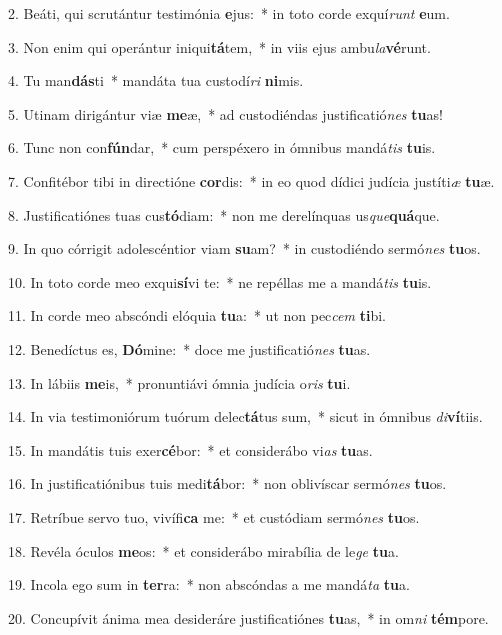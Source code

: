 2. Beáti, qui scrutántur testimónia \textbf{e}jus:~*  in toto corde exquí\textit{runt} \textbf{e}um.\

3. Non enim qui operántur iniqui\textbf{tá}tem,~*  in viis ejus ambu\textit{la}\textbf{vé}runt.\

4. Tu man\textbf{dás}ti~*  mandáta tua custodí\textit{ri} \textbf{ni}mis.\

5. Utinam dirigántur viæ \textbf{me}æ,~*  ad custodiéndas justificatió\textit{nes} \textbf{tu}as!\

6. Tunc non con\textbf{fún}dar,~*  cum perspéxero in ómnibus mandá\textit{tis} \textbf{tu}is.\

7. Confitébor tibi in directióne \textbf{cor}dis:~*  in eo quod dídici judícia justíti\textit{æ} \textbf{tu}æ.\

8. Justificatiónes tuas cus\textbf{tó}diam:~*  non me derelínquas us\textit{que}\textbf{quá}que.\

9. In quo córrigit adolescéntior viam \textbf{su}am?~*  in custodiéndo sermó\textit{nes} \textbf{tu}os.\

10. In toto corde meo exqui\textbf{sí}vi te:~*  ne repéllas me a mandá\textit{tis} \textbf{tu}is.\

11. In corde meo abscóndi elóquia \textbf{tu}a:~*  ut non pec\textit{cem} \textbf{ti}bi.\

12. Benedíctus es, \textbf{Dó}mine:~*  doce me justificatió\textit{nes} \textbf{tu}as.\

13. In lábiis \textbf{me}is,~*  pronuntiávi ómnia judícia o\textit{ris} \textbf{tu}i.\

14. In via testimoniórum tuórum delec\textbf{tá}tus sum,~*  sicut in ómnibus \textit{di}\textbf{ví}tiis.\

15. In mandátis tuis exer\textbf{cé}bor:~*  et considerábo vi\textit{as} \textbf{tu}as.\

16. In justificatiónibus tuis medi\textbf{tá}bor:~*  non oblivíscar sermó\textit{nes} \textbf{tu}os.\

17. Retríbue servo tuo, vivífi\textbf{ca} me:~*  et custódiam sermó\textit{nes} \textbf{tu}os.\

18. Revéla óculos \textbf{me}os:~*  et considerábo mirabília de le\textit{ge} \textbf{tu}a.\

19. Incola ego sum in \textbf{ter}ra:~*  non abscóndas a me mandá\textit{ta} \textbf{tu}a.\

20. Concupívit ánima mea desideráre justificatiónes \textbf{tu}as,~*  in om\textit{ni} \textbf{tém}pore.\

